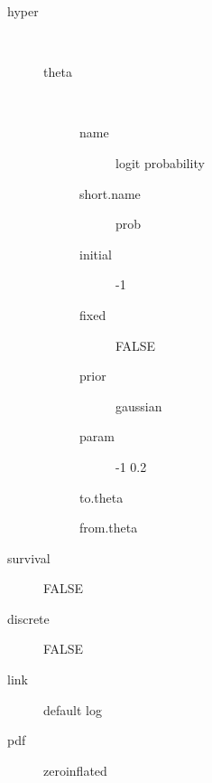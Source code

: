 \begin{description}
	\item[hyper]\ 
	 \begin{description}
	 	\item[theta]\ 
	 	 \begin{description}
	 	 	 \item[ name ] logit probability 
	 	 	 \item[ short.name ] prob 
	 	 	 \item[ initial ] -1 
	 	 	 \item[ fixed ] FALSE 
	 	 	 \item[ prior ] gaussian 
	 	 	 \item[ param ] -1 0.2 
	 	 	 \item[ to.theta ] \verb|| 
	 	 	 \item[ from.theta ] \verb|| 
	 	 \end{description}
	 \end{description}
	 \item[ survival ] FALSE 
	 \item[ discrete ] FALSE 
	 \item[ link ] default log 
	 \item[ pdf ] zeroinflated 
\end{description}
